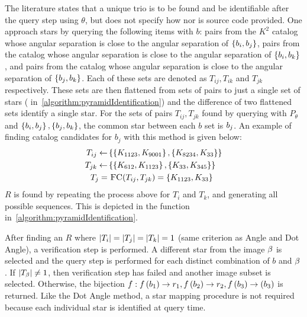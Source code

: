 The literature states that a unique trio is to be found and be identifiable after the query step using $\theta$,
but does not specify how nor is source code provided.
One approach stars by querying the following items with $b$: pairs from the $K^2$ catalog whose angular separation
is close to the angular separation of $\left\{ b_i, b_j \right\}$, pairs from the catalog whose angular separation
is close to the angular separation of $\left\{ b_i, b_k \right\}$, and pairs from the catalog whose angular separation is
close to the angular separation of $\left\{  b_j, b_k  \right\}$.
Each of these sets are denoted as $T_{ij}, T_{ik}$ and $T_{jk}$ respectively.
These sets are then flattened from sets of pairs to just a single set of stars (
in~\autoref{algorithm:pyramidIdentification}) and the difference of two flattened sets identify a single star.
For the sets of pairs $T_{ij}, T_{jk}$ found by querying with $P_\theta$ and $\left\{ b_i, b_j \right\},
\left\{ b_j, b_k \right\}$, the common star between each $b$ set is $b_j$.
An example of finding catalog candidates for $b_j$ with this method is given below:
\begin{equation}
    \begin{aligned}
        T_{ij} \gets& \set{ \set{\vv{K_{1123}}, \vv{K_{9001}}}, \set{\vv{K_{8234}}, \vv{K_{33}}} } \\
        T_{jk} \gets& \set{ \set{\vv{K_{612}}, \vv{K_{1123}}}, \set{\vv{K_{33}}, \vv{K_{345}}} } \\
        T_j =& \  \Call{FC}{T_{ij}, T_{jk}} = \set{\vv{K_{1123}}, \vv{K_{33}}}
    \end{aligned}
\end{equation}
$R$ is found by repeating the process above for $T_i$ and $T_k$, and generating all possible sequences.
This is depicted in the  function in~\autoref{algorithm:pyramidIdentification}.

After finding an $R$ where $\left| T_i \right| = \left| T_j \right| = \left| T_k \right| = 1$ (same criterion as Angle and Dot Angle), a
verification step is performed.
A different star from the image $\beta$ is selected and the query step is performed for each distinct combination
of $b$ and $\beta$.
If $\left| T_\beta \right| \neq 1$, then verification step has failed and another image subset is selected.
Otherwise, the bijection $f : f\left(b_1\right) \rightarrow r_1, f\left(b_2\right)
\rightarrow r_2, f\left(b_3\right) \rightarrow(b_3)$ is returned.
Like the Dot Angle method, a star mapping procedure is not required because each individual star is identified
at query time.

